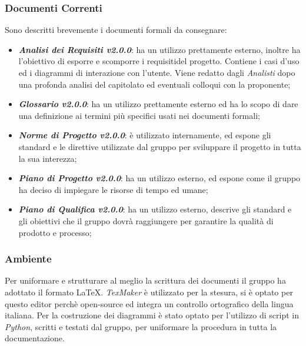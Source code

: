 \subsubsection{Documenti Correnti}
\label{ProcessiSupporto_Documentazione_DocumentiCorrenti}
Sono descritti brevemente i documenti formali da consegnare:
\begin{itemize}
	\item \textbf{\textit{Analisi dei Requisiti v2.0.0}}: ha un utilizzo prettamente esterno, inoltre ha l'obiettivo di esporre e scomporre i requisiti\glossario del progetto. Contiene i casi d'uso ed i diagrammi di interazione con l'utente. Viene redatto dagli \textit{Analisti} dopo una profonda analisi del capitolato ed eventuali colloqui con la proponente; 
	\item \textbf{\textit{Glossario v2.0.0}}: ha un utilizzo prettamente esterno ed ha lo scopo di dare una definizione ai termini più specifici usati nei documenti formali;
	\item \textbf{\textit{Norme di Progetto v2.0.0}}: è utilizzato internamente, ed espone gli standard e le direttive utilizzate dal gruppo per sviluppare il progetto in tutta la sua interezza;
	\item \textbf{\textit{Piano di Progetto v2.0.0}}: ha un utilizzo esterno, ed espone come il gruppo ha deciso di impiegare le risorse di tempo ed umane;
	\item \textbf{\textit{Piano di Qualifica v2.0.0}}: ha un utilizzo esterno, descrive gli standard e gli obiettivi che il gruppo dovrà raggiungere per garantire la qualità di prodotto e processo;
\end{itemize}

\subsubsection{Ambiente}\label{ProcessiSupporto_Documentazione_Ambiente} 
Per uniformare e strutturare al meglio la scrittura dei documenti il gruppo ha adottato il formato \LaTeX. 
\textit{TexMaker} è utilizzato per la stesura, si è optato per questo editor perchè open-source ed integra un controllo ortografico della lingua italiana. 
Per la costruzione dei diagrammi è stato optato per l'utilizzo di script in \textit{Python}, scritti e testati dal gruppo, per uniformare la procedura in tutta la documentazione.

